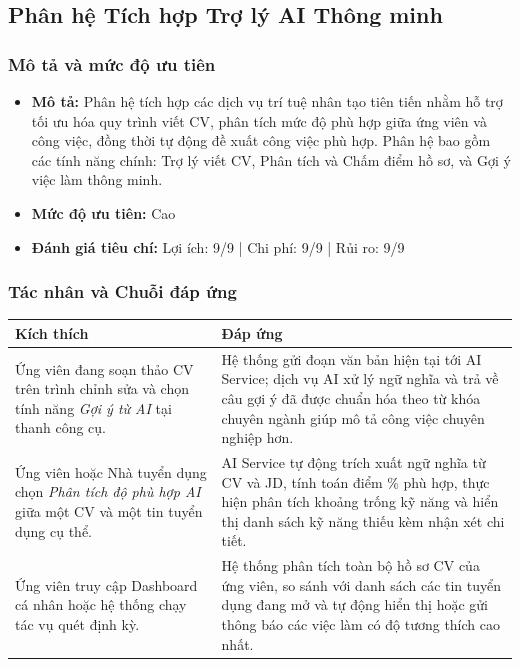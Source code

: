 \subsection{Phân hệ Tích hợp Trợ lý AI Thông minh}

\subsubsection{Mô tả và mức độ ưu tiên}

\begin{itemize}
  \item \textbf{Mô tả:} Phân hệ tích hợp các dịch vụ trí tuệ nhân tạo tiên tiến nhằm hỗ trợ tối ưu hóa quy trình viết CV, phân tích mức độ phù hợp giữa ứng viên và công việc, đồng thời tự động đề xuất công việc phù hợp. Phân hệ bao gồm các tính năng chính: Trợ lý viết CV, Phân tích và Chấm điểm hồ sơ, và Gợi ý việc làm thông minh.
  \item \textbf{Mức độ ưu tiên:} Cao
  \item \textbf{Đánh giá tiêu chí:} Lợi ích: 9/9 | Chi phí: 9/9 | Rủi ro: 9/9
\end{itemize}

\subsubsection{Tác nhân và Chuỗi đáp ứng}

\noindent
\begin{tabularx}{\textwidth}{|L{4.5cm}|X|}
    \hline
    \textbf{Kích thích} & \textbf{Đáp ứng} \\ \hline
    Ứng viên đang soạn thảo CV trên trình chỉnh sửa và chọn tính năng \textit{Gợi ý từ AI} tại thanh công cụ. & Hệ thống gửi đoạn văn bản hiện tại tới AI Service; dịch vụ AI xử lý ngữ nghĩa và trả về câu gợi ý đã được chuẩn hóa theo từ khóa chuyên ngành giúp mô tả công việc chuyên nghiệp hơn. \\ \hline
    Ứng viên hoặc Nhà tuyển dụng chọn \textit{Phân tích độ phù hợp AI} giữa một CV và một tin tuyển dụng cụ thể. & AI Service tự động trích xuất ngữ nghĩa từ CV và JD, tính toán điểm \% phù hợp, thực hiện phân tích khoảng trống kỹ năng và hiển thị danh sách kỹ năng thiếu kèm nhận xét chi tiết. \\ \hline
    Ứng viên truy cập Dashboard cá nhân hoặc hệ thống chạy tác vụ quét định kỳ. & Hệ thống phân tích toàn bộ hồ sơ CV của ứng viên, so sánh với danh sách các tin tuyển dụng đang mở và tự động hiển thị hoặc gửi thông báo các việc làm có độ tương thích cao nhất. \\ \hline
\end{tabularx}

